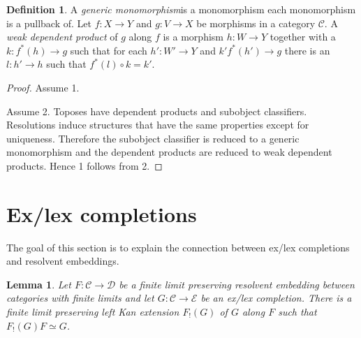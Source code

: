 \documentclass[sort&compress,draft]{elsarticle}
\theoremstyle{plain}
\newtheorem{lemma}[theorem]{Lemma}
\theoremstyle{definition}
\newtheorem{definition}[theorem]{Definition}
\theoremstyle{remark}
\newcommand\hide[1]{}
\newcommand\key[1]{\emph{#1}\label{#1}}
\newcommand\cat\mathcal
\newcommand\of:
\newcommand\ri{^*}
\newcommand\di{_!}
\begin{document}
\begin{definition} A \key{generic monomorphism} is a monomorphism each monomorphism is a pullback of. Let $f:X \to Y$ and $g\of V\to X$ be morphisms in a category $\cat C$. A \key{weak dependent product} of $g$ along $f$ is a morphism $h\of W\to Y$ together with a $k\of f\ri(h)\to g$ such that for each $h'\of W'\to Y$ and $k'f\ri(h')\to g$ there is an $l\of h'\to h$ such that $f\ri(l)\circ k = k'$. \end{definition}


\begin{proof}
Assume 1. 

\hide{Point ahead to lemmas down this paper

ThB -> lccc, closubclass, ThA

Different breakdown

Subobjects form tripos because...
Ex/reg completion gives the same topos as the tripos-to-topos construction because...

}

Assume 2. Toposes have dependent products and subobject classifiers. Resolutions induce structures that have the same properties except for uniqueness. Therefore the subobject classifier is reduced to a generic monomorphism and the dependent products are reduced to weak dependent products. Hence 1 follows from 2. %
\end{proof}

\hide{conclusion... }

\section{Ex/lex completions}
The goal of this section is to explain the connection between ex/lex completions and resolvent embeddings.

\begin{lemma} Let $F\of\cat C\to\cat D$ be a finite limit preserving resolvent embedding between categories with finite limits and let $G\of\cat C\to\cat E$ be an ex/lex completion. There is a finite limit preserving left Kan extension $F\di(G)$ of $G$ along $F$ such that $F\di(G)F\simeq G$.\label{lex ex}\end{lemma}
\end{document}
